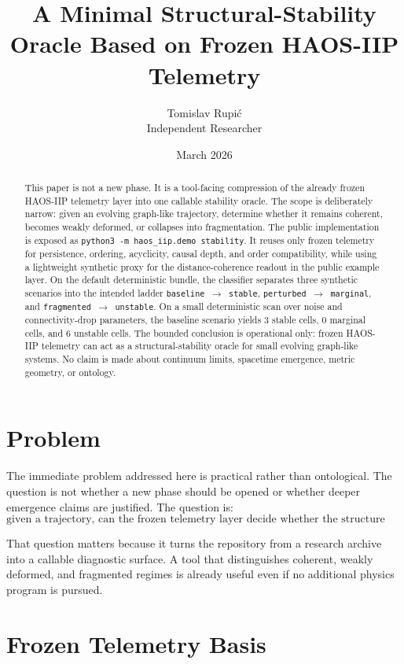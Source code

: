 \documentclass[11pt]{article}
\title{A Minimal Structural-Stability Oracle Based on Frozen HAOS-IIP Telemetry}
\author{Tomislav Rupi\'c \\ Independent Researcher}
\date{March 2026}
\begin{document}
\maketitle

\begin{abstract}
This paper is not a new phase. It is a tool-facing compression of the already frozen HAOS-IIP telemetry layer into one callable stability oracle. The scope is deliberately narrow: given an evolving graph-like trajectory, determine whether it remains coherent, becomes weakly deformed, or collapses into fragmentation. The public implementation is exposed as \texttt{python3 -m haos\_iip.demo stability}. It reuses only frozen telemetry for persistence, ordering, acyclicity, causal depth, and order compatibility, while using a lightweight synthetic proxy for the distance-coherence readout in the public example layer. On the default deterministic bundle, the classifier separates three synthetic scenarios into the intended ladder \texttt{baseline $\to$ stable}, \texttt{perturbed $\to$ marginal}, and \texttt{fragmented $\to$ unstable}. On a small deterministic scan over noise and connectivity-drop parameters, the baseline scenario yields $3$ stable cells, $0$ marginal cells, and $6$ unstable cells. The bounded conclusion is operational only: frozen HAOS-IIP telemetry can act as a structural-stability oracle for small evolving graph-like systems. No claim is made about continuum limits, spacetime emergence, metric geometry, or ontology.
\end{abstract}

\section{Problem}

The immediate problem addressed here is practical rather than ontological. The question is not whether a new phase should be opened or whether deeper emergence claims are justified. The question is:
\[
\text{given a trajectory, can the frozen telemetry layer decide whether the structure remains stable?}
\]

That question matters because it turns the repository from a research archive into a callable diagnostic surface. A tool that distinguishes coherent, weakly deformed, and fragmented regimes is already useful even if no additional physics program is pursued.

\section{Frozen Telemetry Basis}
\end{document}
